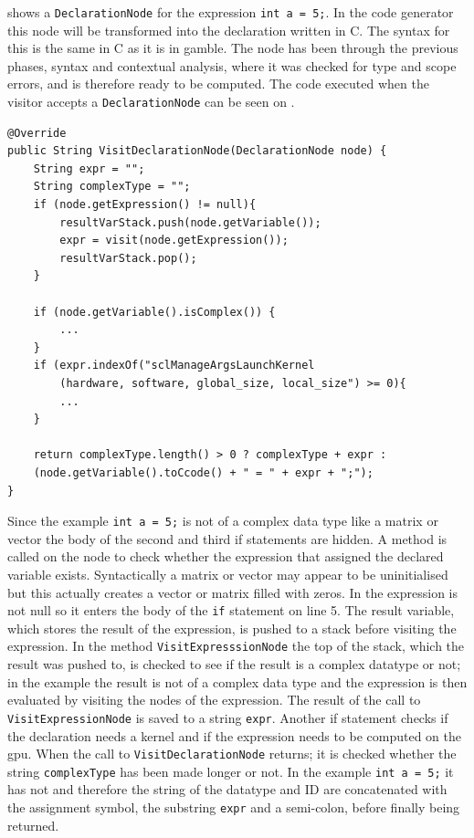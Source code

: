  shows a \texttt{DeclarationNode} for the expression \texttt{int a = 5;}. 
In the code generator this node will be transformed into the declaration written in C. 
The syntax for this is the same in C as it is in \gls{gamble}. 
The node has been through the previous phases, syntax and contextual analysis, where it was checked for type and scope errors, and is therefore ready to be computed. 
The code executed when the visitor accepts a \texttt{DeclarationNode} can be seen on .
\begin{lstlisting}[float, floatplacement=H!, caption=The visit method for visiting a DeclarationNode in the code generator. ,frame=tlrb,label={lst:DeclarationNodeCodeGen}]
@Override
public String VisitDeclarationNode(DeclarationNode node) {
    String expr = "";
    String complexType = "";
    if (node.getExpression() != null){
        resultVarStack.push(node.getVariable());
        expr = visit(node.getExpression());
        resultVarStack.pop();
    }

    if (node.getVariable().isComplex()) {
        ...
    }
    if (expr.indexOf("sclManageArgsLaunchKernel
    	(hardware, software, global_size, local_size") >= 0){
        ...
    }
    
    return complexType.length() > 0 ? complexType + expr : 
    (node.getVariable().toCcode() + " = " + expr + ";");
}
\end{lstlisting}
Since the example \texttt{int a = 5;} is not of a complex data type like a matrix or vector the body of the second and third if statements are hidden.
A method is called on the node to check whether the expression that assigned the declared variable exists. 
Syntactically a matrix or vector may appear to be uninitialised but this actually creates a vector or matrix filled with zeros. 
In  the expression is not null so it enters the body of the \texttt{if} statement on line 5.
The result variable, which stores the result of the expression, is pushed to a stack before visiting the expression.
In the method \texttt{VisitExpresssionNode} the top of the stack, which the result was pushed to, is checked to see if the result is a complex datatype or not; in the example the result is not of a complex data type and the expression is then evaluated by visiting the nodes of the expression.
The result of the call to \texttt{VisitExpressionNode} is saved to a string \texttt{expr}.
Another if statement checks if the declaration needs a kernel and if the expression needs to be computed on the \acrshort{gpu}.
When the call to \texttt{VisitDeclarationNode} returns; it is checked whether the string \texttt{complexType} has been made longer or not.
In the example \texttt{int a = 5;} it has not and therefore the string of the datatype and ID are concatenated with the assignment symbol, the substring \texttt{expr} and a semi-colon, before finally being returned.
